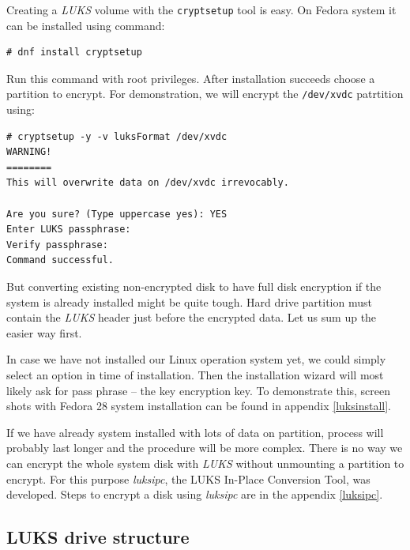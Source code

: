 Creating a {\it LUKS} volume with the {\tt cryptsetup} tool is easy.
On Fedora system it can be installed using command:
\begin{lstlisting}[columns=fixed,basicstyle=\ttfamily\footnotesize,tabsize=4,backgroundcolor=\color{yellow!10}]
# dnf install cryptsetup
\end{lstlisting}
Run this command with root privileges.
After installation succeeds choose a partition to encrypt.
For demonstration, we will encrypt the {\tt /dev/xvdc} patrtition using:
\begin{lstlisting}[columns=fixed,basicstyle=\ttfamily\footnotesize,tabsize=4,backgroundcolor=\color{yellow!10}]
# cryptsetup -y -v luksFormat /dev/xvdc
WARNING!
========
This will overwrite data on /dev/xvdc irrevocably.

Are you sure? (Type uppercase yes): YES
Enter LUKS passphrase:
Verify passphrase:
Command successful.
\end{lstlisting}
But converting existing non-encrypted disk to have full disk encryption if the system is already installed might be quite tough.
Hard drive partition must contain the {\it LUKS} header just before the encrypted data.
Let us sum up the easier way first.

In case we have not installed our Linux operation system yet, we could simply select an option in time of installation.
Then the installation wizard will most likely ask for pass phrase -- the key encryption key.
To demonstrate this, screen shots with Fedora 28 system installation can be found in appendix \ref{luksinstall}.

If we have already system installed with lots of data on partition, process will probably last longer and the procedure will be more complex.
There is no way we can encrypt the whole system disk with {\it LUKS} without unmounting a partition to encrypt.
For this purpose {\it luksipc}, the LUKS In-Place Conversion Tool, was developed.
Steps to encrypt a disk using {\it luksipc} are in the appendix \ref{luksipc}.



\subsection{LUKS drive structure}

